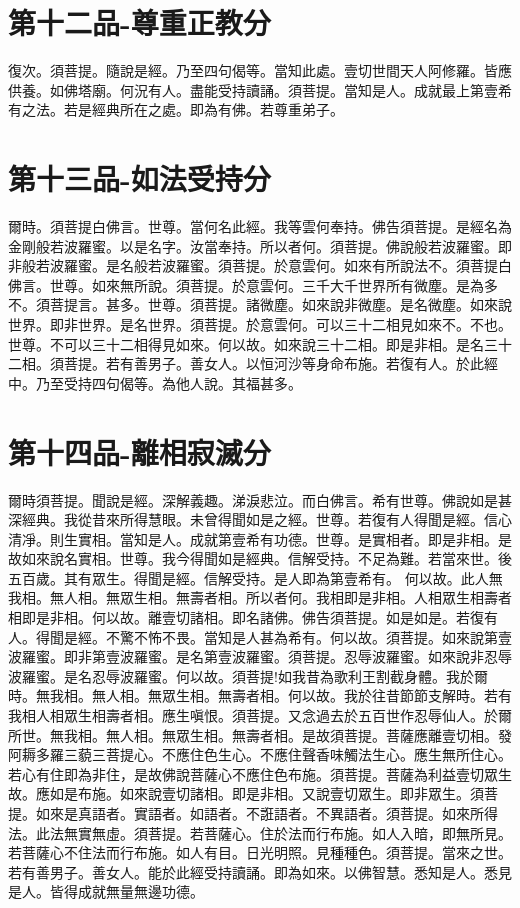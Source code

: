 \documentclass[a6paper, 22pt, twocolumn]{cvertbook}
\begin{document}
\chapter{第十二品-尊重正教分}
復次。須菩提。隨說是經。乃至四句偈等。當知此處。壹切世間天人阿修羅。皆應供養。如佛塔廟。何況有人。盡能受持讀誦。須菩提。當知是人。成就最上第壹希有之法。若是經典所在之處。即為有佛。若尊重弟子。
\chapter{第十三品-如法受持分}
爾時。須菩提白佛言。世尊。當何名此經。我等雲何奉持。佛告須菩提。是經名為金剛般若波羅蜜。以是名字。汝當奉持。所以者何。須菩提。佛說般若波羅蜜。即非般若波羅蜜。是名般若波羅蜜。須菩提。於意雲何。如來有所說法不。須菩提白佛言。世尊。如來無所說。須菩提。於意雲何。三千大千世界所有微塵。是為多不。須菩提言。甚多。世尊。須菩提。諸微塵。如來說非微塵。是名微塵。如來說世界。即非世界。是名世界。須菩提。於意雲何。可以三十二相見如來不。不也。世尊。不可以三十二相得見如來。何以故。如來說三十二相。即是非相。是名三十二相。須菩提。若有善男子。善女人。以恒河沙等身命布施。若復有人。於此經中。乃至受持四句偈等。為他人說。其福甚多。
\chapter{第十四品-離相寂滅分}
爾時須菩提。聞說是經。深解義趣。涕淚悲泣。而白佛言。希有世尊。佛說如是甚深經典。我從昔來所得慧眼。未曾得聞如是之經。世尊。若復有人得聞是經。信心清凈。則生實相。當知是人。成就第壹希有功德。世尊。是實相者。即是非相。是故如來說名實相。世尊。我今得聞如是經典。信解受持。不足為難。若當來世。後五百歲。其有眾生。得聞是經。信解受持。是人即為第壹希有。
何以故。此人無我相。無人相。無眾生相。無壽者相。所以者何。我相即是非相。人相眾生相壽者相即是非相。何以故。離壹切諸相。即名諸佛。佛告須菩提。如是如是。若復有人。得聞是經。不驚不怖不畏。當知是人甚為希有。何以故。須菩提。如來說第壹波羅蜜。即非第壹波羅蜜。是名第壹波羅蜜。須菩提。忍辱波羅蜜。如來說非忍辱波羅蜜。是名忍辱波羅蜜。何以故。須菩提!如我昔為歌利王割截身體。我於爾時。無我相。無人相。無眾生相。無壽者相。何以故。我於往昔節節支解時。若有我相人相眾生相壽者相。應生嗔恨。須菩提。又念過去於五百世作忍辱仙人。於爾所世。無我相。無人相。無眾生相。無壽者相。是故須菩提。菩薩應離壹切相。發阿耨多羅三藐三菩提心。不應住色生心。不應住聲香味觸法生心。應生無所住心。若心有住即為非住，是故佛說菩薩心不應住色布施。須菩提。菩薩為利益壹切眾生故。應如是布施。如來說壹切諸相。即是非相。又說壹切眾生。即非眾生。須菩提。如來是真語者。實語者。如語者。不誑語者。不異語者。須菩提。如來所得法。此法無實無虛。須菩提。若菩薩心。住於法而行布施。如人入暗，即無所見。若菩薩心不住法而行布施。如人有目。日光明照。見種種色。須菩提。當來之世。若有善男子。善女人。能於此經受持讀誦。即為如來。以佛智慧。悉知是人。悉見是人。皆得成就無量無邊功德。
\end{document}
